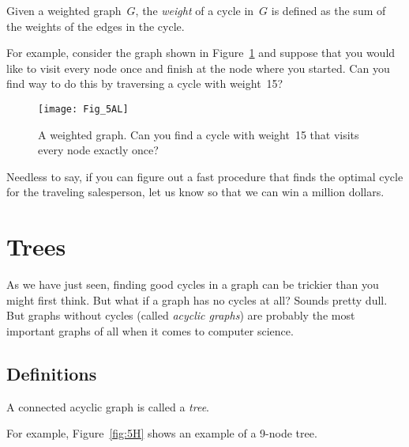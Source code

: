 \begin{definition}
Given a weighted graph~$G$, the \emph{weight} of a cycle in~$G$ is
defined as the sum of the weights of the edges in the cycle.
\end{definition}

For example, consider the graph shown in Figure~\ref{fig:5AL} and
suppose that you would like to visit every node once and finish at the
node where you started.  Can you find  way to do this by traversing a
cycle with weight~15?

\begin{figure}\redrawn

\texttt{[image: Fig\_5AL]}

\caption{A weighted graph.  Can you find a cycle with weight~15 that
  visits every node exactly once?}

\label{fig:5AL}
\end{figure}

Needless to say, if you can figure out a fast procedure that finds the
optimal cycle for the traveling salesperson, let us know so that we
can win a million dollars.

\begin{problems}
\examproblems
{}

\homeworkproblems
{}
\end{problems}

\section{Trees}\label{trees-sec}

As we have just seen, finding good cycles in a graph can be trickier
than you might first think.  But what if a graph has no cycles at all?
Sounds pretty dull.  But graphs without cycles (called \emph{acyclic
  graphs}) are probably the most important graphs of all when it comes
to computer science.

\subsection{Definitions}

\begin{definition}\label{def:tree}
A connected acyclic graph is called a \emph{tree}.
\end{definition}

For example, Figure~\ref{fig:5H} shows an example of a 9-node tree.

